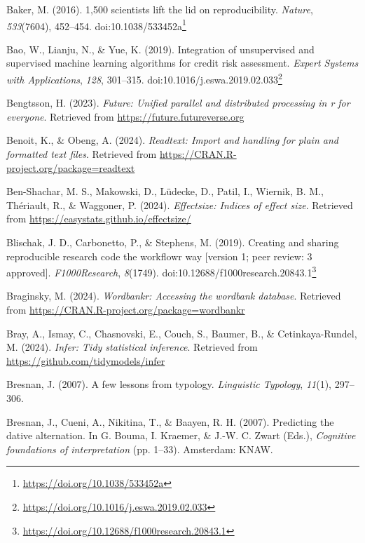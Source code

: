 \documentclass[
  letterpaper,
]{latex/krantz}
\newlength{\cslhangindent}
\newenvironment{CSLReferences}[2] %
 {\begin{list}{}{%
  \setlength{\itemindent}{0pt}
  \setlength{\leftmargin}{0pt}
  \setlength{\parsep}{0pt}
  \ifodd #1
   \setlength{\leftmargin}{\cslhangindent}
   \setlength{\itemindent}{-1\cslhangindent}
  \fi
  \setlength{\itemsep}{#2\baselineskip}}}
 {\end{list}}
\theoremstyle{definition}
\theoremstyle{remark}
\DeclareRobustCommand{\href}[2]{#2\footnote{\url{#1}}}
\begin{document}
\begin{CSLReferences}{1}{0}
Baker, M. (2016). 1,500 scientists lift the lid on reproducibility.
\emph{Nature}, \emph{533}(7604), 452--454.
doi:\href{https://doi.org/10.1038/533452a}{10.1038/533452a}

Bao, W., Lianju, N., \& Yue, K. (2019). Integration of unsupervised and
supervised machine learning algorithms for credit risk assessment.
\emph{Expert Systems with Applications}, \emph{128}, 301--315.
doi:\href{https://doi.org/10.1016/j.eswa.2019.02.033}{10.1016/j.eswa.2019.02.033}

Bengtsson, H. (2023). \emph{Future: Unified parallel and distributed
processing in r for everyone}. Retrieved from
\url{https://future.futureverse.org}

Benoit, K., \& Obeng, A. (2024). \emph{Readtext: Import and handling for
plain and formatted text files}. Retrieved from
\url{https://CRAN.R-project.org/package=readtext}

Ben-Shachar, M. S., Makowski, D., Lüdecke, D., Patil, I., Wiernik, B.
M., Thériault, R., \& Waggoner, P. (2024). \emph{Effectsize: Indices of
effect size}. Retrieved from
\url{https://easystats.github.io/effectsize/}

Blischak, J. D., Carbonetto, P., \& Stephens, M. (2019). Creating and
sharing reproducible research code the workflowr way {[}version 1; peer
review: 3 approved{]}. \emph{F1000Research}, \emph{8}(1749).
doi:\href{https://doi.org/10.12688/f1000research.20843.1}{10.12688/f1000research.20843.1}

Braginsky, M. (2024). \emph{Wordbankr: Accessing the wordbank database}.
Retrieved from \url{https://CRAN.R-project.org/package=wordbankr}

Bray, A., Ismay, C., Chasnovski, E., Couch, S., Baumer, B., \&
Cetinkaya-Rundel, M. (2024). \emph{Infer: Tidy statistical inference}.
Retrieved from \url{https://github.com/tidymodels/infer}

Bresnan, J. (2007). A few lessons from typology. \emph{Linguistic
Typology}, \emph{11}(1), 297--306.

Bresnan, J., Cueni, A., Nikitina, T., \& Baayen, R. H. (2007).
Predicting the dative alternation. In G. Bouma, I. Kraemer, \& J.-W. C.
Zwart (Eds.), \emph{Cognitive foundations of interpretation} (pp.
1--33). Amsterdam: KNAW.


\end{CSLReferences}
\end{document}
